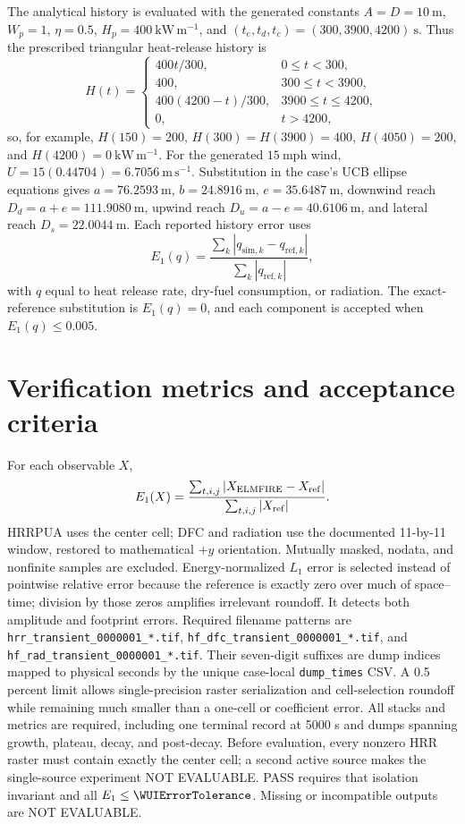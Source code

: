 The analytical history is evaluated with the generated constants
\(A=D=10~\mathrm{m}\), \(W_p=1\), \(\eta=0.5\),
\(H_p=400~\mathrm{kW\,m^{-1}}\), and
\((t_e,t_d,t_c)=(300,3900,4200)~\mathrm{s}\).  Thus the prescribed
triangular heat-release history is
\[
 H(t)=\begin{cases}
 400t/300,&0\leq t<300,\\
 400,&300\leq t<3900,\\
 400(4200-t)/300,&3900\leq t\leq4200,\\
 0,&t>4200,
 \end{cases}
\]
so, for example, \(H(150)=200\), \(H(300)=H(3900)=400\),
\(H(4050)=200\), and \(H(4200)=0~\mathrm{kW\,m^{-1}}\).
For the generated \(15~\mathrm{mph}\) wind,
\(U=15(0.44704)=6.7056~\mathrm{m\,s^{-1}}\).  Substitution in the
case's UCB ellipse equations gives
\(a=76.2593~\mathrm{m}\), \(b=24.8916~\mathrm{m}\),
\(e=35.6487~\mathrm{m}\), downwind reach
\(D_d=a+e=111.9080~\mathrm{m}\), upwind reach
\(D_u=a-e=40.6106~\mathrm{m}\), and lateral reach
\(D_s=22.0044~\mathrm{m}\).  Each reported history error uses
\[
 E_1(q)=\frac{\sum_k|q_{\mathrm{sim},k}-q_{\mathrm{ref},k}|}
              {\sum_k|q_{\mathrm{ref},k}|},
\]
with \(q\) equal to heat release rate, dry-fuel consumption, or radiation.
The exact-reference substitution is \(E_1(q)=0\), and each component is
accepted when \(E_1(q)\leq0.005\).

\section{Verification metrics and acceptance criteria}

For each observable \(X\),
\[
 E_1(X)=\frac{\sum_{t,i,j}|X_{\rm ELMFIRE}-X_{\rm ref}|}
                   {\sum_{t,i,j}|X_{\rm ref}|}.
\]
HRRPUA uses the center cell; DFC and radiation use the documented 11-by-11 window, restored to mathematical \(+y\) orientation. Mutually masked, nodata, and nonfinite samples are excluded. Energy-normalized \(L_1\) error is selected instead of pointwise relative error because the reference is exactly zero over much of space--time; division by those zeros amplifies irrelevant roundoff. It detects both amplitude and footprint errors. Required filename patterns are \texttt{hrr\_transient\_0000001\_*.tif}, \texttt{hf\_dfc\_transient\_0000001\_*.tif}, and \texttt{hf\_rad\_transient\_0000001\_*.tif}. Their seven-digit suffixes are dump indices mapped to physical seconds by the unique case-local \texttt{dump\_times} CSV. A 0.5 percent limit allows single-precision raster serialization and cell-selection roundoff while remaining much smaller than a one-cell or coefficient error. All stacks and metrics are required, including one terminal record at 5000 s and dumps spanning growth, plateau, decay, and post-decay. Before evaluation, every nonzero HRR raster must contain exactly the center cell; a second active source makes the single-source experiment NOT EVALUABLE. PASS requires that isolation invariant and all \(E_1\le\WUIErrorTolerance\). Missing or incompatible outputs are NOT EVALUABLE.

